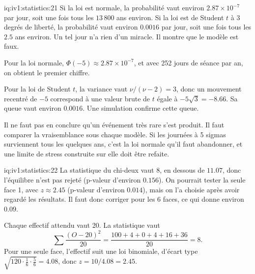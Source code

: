 \begin{solution}{iq:iv1:statistics:21}
Si la loi est normale, la probabilité vaut environ $2.87 \times 10^{-7}$ par jour, soit une fois tous les $13\,800$ ans environ. Si la loi est de Student $t$ à 3 degrés de liberté, la probabilité vaut environ $0.0016$ par jour, soit une fois tous les $2.5$ ans environ. Un tel jour n'a rien d'un miracle. Il montre que le modèle est faux.

Pour la loi normale, $\Phi(-5) \approx 2.87 \times 10^{-7}$, et avec 252 jours de séance par an, on obtient le premier chiffre.

Pour la loi de Student $t$, la variance vaut $\nu/(\nu - 2) = 3$, donc un mouvement recentré de $-5$ correspond à une valeur brute de $t$ égale à $-5\sqrt{3} = -8.66$. Sa queue vaut environ $0.0016$. Une simulation confirme cette queue.

Il ne faut pas en conclure qu'un événement très rare s'est produit. Il faut comparer la vraisemblance sous chaque modèle. Si les journées à 5 sigmas surviennent tous les quelques ans, c'est la loi normale qu'il faut abandonner, et une limite de stress construite sur elle doit être refaite.

\end{solution}

\begin{solution}{iq:iv1:statistics:22}
La statistique du chi-deux vaut 8, en dessous de $11.07$, donc l'équilibre n'est pas rejeté (p-valeur d'environ $0.156$). On pourrait tester la seule face 1, avec $z \approx 2.45$ (p-valeur d'environ $0.014$), mais on l'a choisie après avoir regardé les résultats. Il faut donc corriger pour les 6 faces, ce qui donne environ $0.09$.

Chaque effectif attendu vaut 20. La statistique vaut
\[
\sum \frac{(O - 20)^2}{20} = \frac{100 + 4 + 0 + 4 + 16 + 36}{20} = 8.
\]
Pour une seule face, l'effectif suit une loi binomiale, d'écart type $\sqrt{120 \cdot \frac16 \cdot \frac56} = 4.08$, donc $z = 10/4.08 = 2.45$.

\end{solution}

